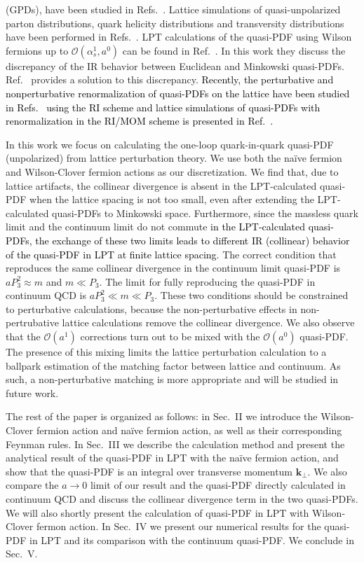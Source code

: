 \documentclass[english,preprint,aps,prd,showpacs,superscriptaddress,nofootinbib,tightenlines]{revtex4}
\newcommand{\emphz}[1]{\textcolor{black}{#1}}
\begin{document}
(GPDs), have been studied in Refs.~\cite{Ji:2015qla,Xiong:2015nua}. Lattice simulations of quasi-unpolarized
parton distributions, quark helicity distributions and transversity
distributions have been performed in Refs.~\cite{Lin:2014zya,Alexandrou:2015rja,Chen:2016utp}. LPT calculations of the quasi-PDF
using Wilson fermions up to $\mathcal{O}\left(\alpha_{s}^{1},a^0\right)$
can be found in Ref.~\cite{Carlson:2017gpk}. In this work they discuss the discrepancy of the IR behavior between Euclidean and Minkowski quasi-PDFs. Ref.~\cite{Briceno:2017cpo} provides a solution to this discrepancy. \emphz{Recently, the perturbative and nonperturbative renormalization of quasi-PDFs on the lattice have been studied in Refs.~\cite{Constantinou:2017sej,Alexandrou:2017huk} using the RI scheme and lattice simulations of quasi-PDFs with renormalization in the RI/MOM scheme is presented in Ref.~\cite{Chen:2017mzz}.}

In this work we focus
on calculating the one-loop quark-in-quark quasi-PDF (unpolarized) from lattice perturbation
theory. We use both the na\"ive fermion and Wilson-Clover fermion actions as our discretization. We find that, due to lattice artifacts, the collinear divergence is absent in the LPT-calculated quasi-PDF when the lattice spacing is not too small, even after extending the LPT-calculated quasi-PDFs to Minkowski space. Furthermore, since the massless quark limit and the continuum limit do not commute \emphz{in the LPT-calculated quasi-PDFs, the exchange of these two limits leads to different IR (collinear) behavior of the quasi-PDF in LPT at finite lattice spacing}. The correct condition that reproduces the same collinear divergence in the continuum limit quasi-PDF is $aP_3^2\approx m$ and $m \ll P_3$. The limit for fully reproducing the quasi-PDF in continuum QCD is $aP_3^2\ll m \ll P_3$. These two conditions should be constrained to perturbative calculations, because the non-perturbative effects in non-pertrubative lattice calculations remove the collinear divergence. We also observe that the $\mathcal{O}\left(a^1\right)$ corrections turn out to be mixed with the $\mathcal{O}\left(a^0\right)$ quasi-PDF. The presence of this mixing limits the lattice perturbation calculation to a ballpark estimation of the matching factor between lattice and continuum.  As such, a non-perturbative matching is more appropriate and will be studied in future work.

The rest of the paper
is organized as follows: in Sec.~II we introduce the Wilson-Clover
fermion action and na\"ive fermion action, as well as their corresponding Feynman rules. In Sec.~III we
describe the calculation method and present the analytical result
of the quasi-PDF in LPT with the na\"ive fermion action, and show that the quasi-PDF is an integral over transverse momentum
$\boldsymbol{k}_{\perp}$. We also compare the $a\rightarrow0$ limit
of our result and the quasi-PDF directly calculated in continuum QCD
and discuss the collinear divergence term in the two quasi-PDFs. {We
will also shortly present the calculation of quasi-PDF in LPT with Wilson-Clover fermon action}. In Sec.~IV
we present our numerical results for the  quasi-PDF in LPT
and its comparison with the continuum quasi-PDF. We conclude in Sec.~V.
\end{document}
